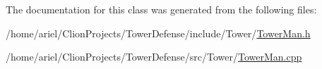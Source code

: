 The documentation for this class was generated from the following files\+:\begin{DoxyCompactItemize}
\item 
/home/ariel/\+Clion\+Projects/\+Tower\+Defense/include/\+Tower/\hyperlink{TowerMan_8h}{Tower\+Man.\+h}\item 
/home/ariel/\+Clion\+Projects/\+Tower\+Defense/src/\+Tower/\hyperlink{TowerMan_8cpp}{Tower\+Man.\+cpp}\end{DoxyCompactItemize}
